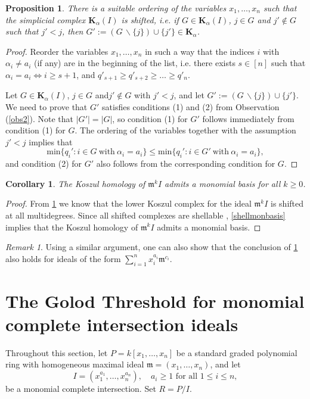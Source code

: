 \documentclass[10pt,reqno]{amsart}
\newtheorem{proposition}[subsection]{Proposition}
\newtheorem{corollary}[subsection]{Corollary}
\theoremstyle{definition}
\theoremstyle{remark}
\newtheorem{remark}[subsection]{Remark}
\numberwithin{equation}{section}
\newcommand{\m}{\mathfrak m}
\numberwithin{equation}{section}
\begin{document}
\begin{proposition}\label{shiftedsimplex}
There is a suitable ordering of the variables $x_1, \ldots, x_n$ such that the simplicial complex $\mathbf K_{\alpha}(I)$ is shifted, i.e. if $G\in \mathbf K_{\alpha}(I)$, $j\in G$ and $j'\notin G$ such that $j'<j$, then $G':=(G\, \backslash \{j\}) \cup \{j'\} \in \mathbf K_{\alpha}$.
\end{proposition}
\begin{proof}
Reorder the variables $x_1, \ldots, x_n$ in such a way that the indices $i$ with $\alpha_i\ne a_i$ (if any) are in the beginning of the list, i.e. 
there exists $s\in [n]$ such that $\alpha_i=a_i \Leftrightarrow i\ge s+1$, and $q'_{s+1}\ge q'_{s+2}\ge \ldots \ge q'_n$.

Let $G\in \mathbf K_{\alpha}(I)$, $j\in G$ and$j'\notin G$ with $j'<j$, and let $G':=(G\, \backslash \{j\}) \cup \{j'\}$. We need to prove that $G'$ satisfies conditions (1) and (2) from Observation (\ref{obs2}). Note that $|G'|=|G|$, so condition (1) for $G'$ follows immediately from condition (1) for $G$. The ordering of the variables together with the assumption $j'<j$ implies that 
$$
\mathrm{min}\{q_i': i \in G \ \mathrm{with} \ \alpha_i=a_i\} \le \mathrm{min}\{q_i': i \in G'\  \mathrm{with} \ \alpha_i=a_i\},
$$
and condition (2) for $G'$ also follows from the corresponding condition for $G$.
\end{proof}
\begin{corollary}\label{monomialbasisforCI}
    The Koszul homology of  $\m^k I$ admits a monomial basis for all $k\geq 0$.
\end{corollary}
\begin{proof}
    From \cref{shiftedsimplex} we know that the lower Koszul complex for the ideal $\m^k I$ is shifted at all multidegrees. Since all  shifted complexes are shellable \cite[Theorem 11.3]{bjorner1997shellable}, \cref{shellmonbasis} implies that the Koszul homology of $\m^k I$ admits a monomial basis.
\end{proof}

\begin{remark}
    Using a similar argument, one can also show that the conclusion of \cref{monomialbasisforCI} also holds for ideals of the form $\sum_{i=1}^nx_i^{a_i}\m^{c_i}$. 
\end{remark}


\section{The Golod Threshold for monomial complete intersection ideals}
Throughout this section, let $P=k[x_1,\ldots,x_n]$ be a standard graded polynomial ring with homogeneous maximal ideal $\mathfrak m=(x_1,\ldots,x_n)$, and let
\[
I=(x_1^{a_1},\ldots,x_n^{a_n}), \quad a_i\geq 1 \text{ for all } 1\leq i\leq n,
\]
be a monomial complete intersection. Set $R=P/I$. 
\end{document}
